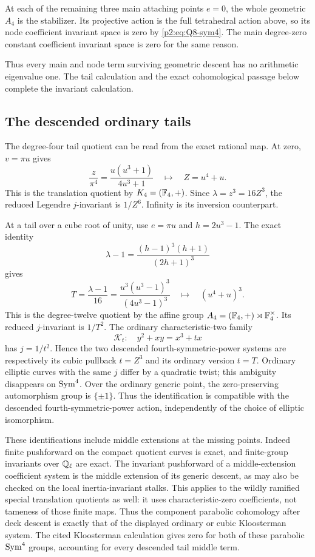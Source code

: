 At each of the remaining three main attaching points $e=0$, the
whole geometric $A_4$ is the stabilizer.  Its projective action is
the full tetrahedral action above, so its node coefficient invariant
space is zero by \eqref{p2:eq:Q8-sym4}.  The main degree-zero constant
coefficient invariant space is zero for the same reason.

Thus every main and node term surviving geometric descent has no
arithmetic eigenvalue one. The tail calculation and the exact
cohomological passage below complete the invariant calculation.
\subsection{The descended ordinary tails}
The degree-four tail quotient can be read from the exact rational map.
At zero, $v=\pi u$ gives
\[
\frac{z}{\pi^4}=\frac{u(u^3+1)}{4u^3+1}
\quad\longmapsto\quad Z=u^4+u.
\]
This is the translation quotient by $K_4=(\mathbb F_4,+)$. Since
$\lambda=z^3=16Z^3$, the reduced Legendre $j$-invariant is $1/Z^6$.
Infinity is its inversion counterpart.

At a tail over a cube root of unity, use $e=\pi u$ and $h=2u^3-1$.
The exact identity
\[
\lambda-1=\frac{(h-1)^3(h+1)}{(2h+1)^3}
\]
gives
\[
T=\frac{\lambda-1}{16}
=\frac{u^3(u^3-1)^3}{(4u^3-1)^3}
\quad\longmapsto\quad (u^4+u)^3.
\]
This is the degree-twelve quotient by the affine group
$A_4=(\mathbb F_4,+)\rtimes\mathbb F_4^\times$. Its reduced $j$-invariant is $1/T^2$.
The ordinary characteristic-two family
\[
\mathcal K_t:\quad y^2+xy=x^3+tx
\]
has $j=1/t^2$. Hence the two descended fourth-symmetric-power systems
are respectively its cubic pullback $t=Z^3$ and its ordinary version
$t=T$. Ordinary elliptic curves with the same $j$ differ by a quadratic
twist; this ambiguity disappears on $\operatorname{Sym}^4$.
Over the ordinary generic point, the zero-preserving automorphism group
is $\{\pm1\}$. Thus the identification is compatible with the descended
fourth-symmetric-power action, independently of the choice of elliptic
isomorphism.

These identifications include middle extensions at the missing points.
Indeed finite pushforward on the compact quotient curves is exact, and
finite-group invariants over $\mathbb Q_\ell$ are exact. The invariant pushforward
of a middle-extension coefficient system is the middle extension of its
generic descent, as may also be checked on the local inertia-invariant
stalks. This applies to the wildly ramified special translation quotients
as well: it uses characteristic-zero coefficients, not tameness of those
finite maps. Thus the component parabolic cohomology after deck descent
is exactly that of the displayed ordinary or cubic Kloosterman system.
The cited Kloosterman calculation gives zero for both of these parabolic
$\operatorname{Sym}^4$ groups, accounting for every descended tail middle term.
